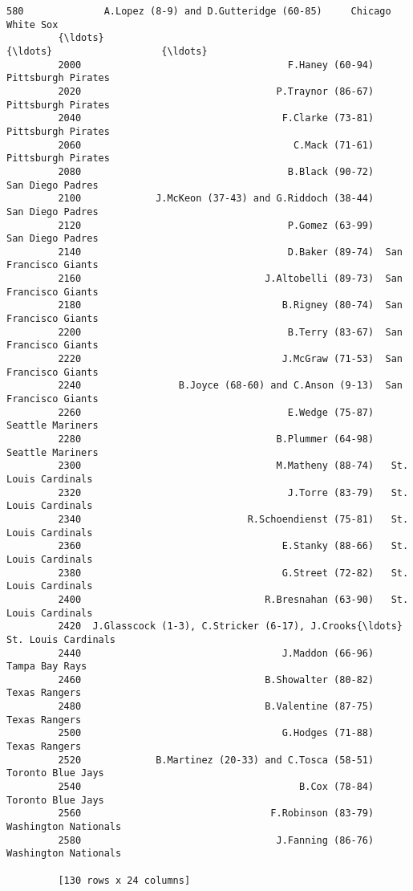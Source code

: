 \documentclass[11pt]{article}
\begin{document}
\begin{Verbatim}[commandchars=\\\{\}]
         580              A.Lopez (8-9) and D.Gutteridge (60-85)     Chicago White Sox  
         {\ldots}                                                 {\ldots}                   {\ldots}  
         2000                                    F.Haney (60-94)    Pittsburgh Pirates  
         2020                                  P.Traynor (86-67)    Pittsburgh Pirates  
         2040                                   F.Clarke (73-81)    Pittsburgh Pirates  
         2060                                     C.Mack (71-61)    Pittsburgh Pirates  
         2080                                    B.Black (90-72)      San Diego Padres  
         2100             J.McKeon (37-43) and G.Riddoch (38-44)      San Diego Padres  
         2120                                    P.Gomez (63-99)      San Diego Padres  
         2140                                    D.Baker (89-74)  San Francisco Giants  
         2160                                J.Altobelli (89-73)  San Francisco Giants  
         2180                                   B.Rigney (80-74)  San Francisco Giants  
         2200                                    B.Terry (83-67)  San Francisco Giants  
         2220                                   J.McGraw (71-53)  San Francisco Giants  
         2240                 B.Joyce (68-60) and C.Anson (9-13)  San Francisco Giants  
         2260                                    E.Wedge (75-87)      Seattle Mariners  
         2280                                  B.Plummer (64-98)      Seattle Mariners  
         2300                                  M.Matheny (88-74)   St. Louis Cardinals  
         2320                                    J.Torre (83-79)   St. Louis Cardinals  
         2340                             R.Schoendienst (75-81)   St. Louis Cardinals  
         2360                                   E.Stanky (88-66)   St. Louis Cardinals  
         2380                                   G.Street (72-82)   St. Louis Cardinals  
         2400                                R.Bresnahan (63-90)   St. Louis Cardinals  
         2420  J.Glasscock (1-3), C.Stricker (6-17), J.Crooks{\ldots}   St. Louis Cardinals  
         2440                                   J.Maddon (66-96)        Tampa Bay Rays  
         2460                                B.Showalter (80-82)         Texas Rangers  
         2480                                B.Valentine (87-75)         Texas Rangers  
         2500                                   G.Hodges (71-88)         Texas Rangers  
         2520             B.Martinez (20-33) and C.Tosca (58-51)     Toronto Blue Jays  
         2540                                      B.Cox (78-84)     Toronto Blue Jays  
         2560                                 F.Robinson (83-79)  Washington Nationals  
         2580                                  J.Fanning (86-76)  Washington Nationals  
         
         [130 rows x 24 columns]
\end{Verbatim}
            
\end{document}
